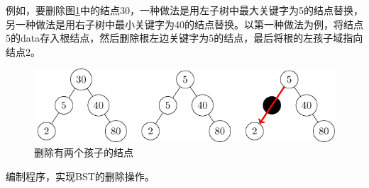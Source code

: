 \documentclass[10pt]{article}
\begin{document}
\begin{enumerate}
例如，要删除图\ref{delete3}中的结点30，一种做法是用左子树中最大关键字为5的结点替换，另一种做法是用右子树中最小关键字为40的结点替换。以第一种做法为例，将结点5的data存入根结点，然后删除根左边关键字为5的结点，最后将根的左孩子域指向结点2。
\begin{figure}[htbp]
\centering
\includegraphics[width=5in]{TIKZ/bst/bst_delete3.pdf}  
\caption{删除有两个孩子的结点}\label{delete3}
\end{figure}
\end{enumerate}

\begin{xiti}
编制程序，实现BST的删除操作。
\end{xiti}
\end{document}
